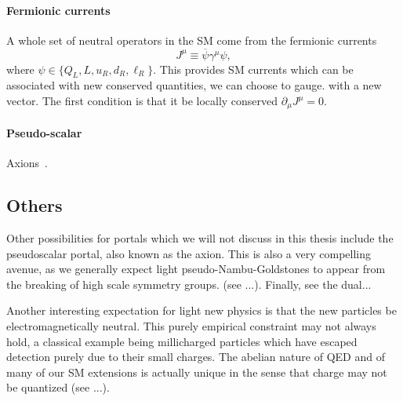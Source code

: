 \paragraph{Fermionic currents}

A whole set of neutral operators in the SM come from the fermionic currents
\begin{equation}
 J^\mu \equiv \overline{\psi} \gamma^\mu \psi,
\end{equation}
where $\psi \in \{Q_L, L, u_R, d_R, \ell_R\}$. This provides SM currents which can be associated with new conserved quantities, \eg we can choose to gauge. with a new vector. The first condition is that it be locally conserved $\partial_\mu J^\mu = 0$. 

\paragraph{Pseudo-scalar} Axions~\cite{Weinberg:1977ma}.

\subsection{Others}

Other possibilities for portals which we will not discuss in this thesis include the pseudoscalar portal, also known as the axion. This is also a very compelling avenue, as we generally expect light pseudo-Nambu-Goldstones to appear from the breaking of high scale symmetry groups. (see ...). Finally, see the dual...

Another interesting expectation for light new physics is that the new particles be electromagnetically neutral. This purely empirical constraint may not always hold, a classical example being millicharged particles which have escaped detection purely due to their small charges. The abelian nature of QED and of many of our SM extensions is actually unique in the sense that charge may not be quantized (see \eg ...).